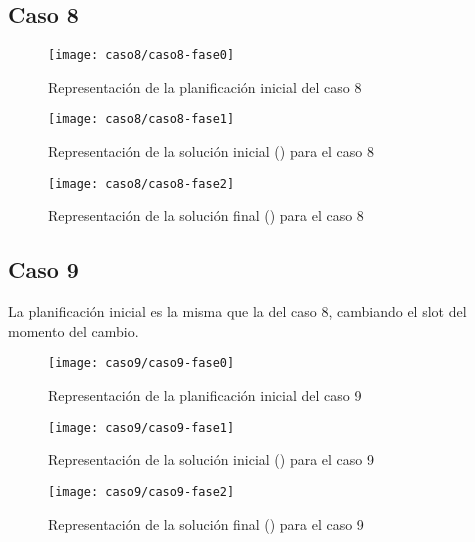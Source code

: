 \FloatBarrier
\newpage
\subsection{Caso 8}

\begin{figure}[!h]
	\centering
	\texttt{[image: caso8/caso8-fase0]}
	\caption{Representación de la planificación inicial del caso 8}
	\label{fig:caso8-fase0}
\end{figure}

\begin{figure}[!h]
	\centering
	\texttt{[image: caso8/caso8-fase1]}
	\caption{Representación de la solución inicial (\faseuno{}) para el caso 8}
	\label{fig:caso8-fase1}
\end{figure}

\begin{figure}[!h]
	\centering
	\texttt{[image: caso8/caso8-fase2]}
	\caption{Representación de la solución final (\fasedos{}) para el caso 8}
	\label{fig:caso8-fase2}
\end{figure}

\FloatBarrier
\newpage
\subsection{Caso 9}

La planificación inicial es la misma que la del caso 8, cambiando el slot del momento del cambio.

\begin{figure}[!h]
	\centering
	\texttt{[image: caso9/caso9-fase0]}
	\caption{Representación de la planificación inicial del caso 9}
	\label{fig:caso9-fase0}
\end{figure}

\begin{figure}[!h]
	\centering
	\texttt{[image: caso9/caso9-fase1]}
	\caption{Representación de la solución inicial (\faseuno{}) para el caso 9}
	\label{fig:caso9-fase1}
\end{figure}

\begin{figure}[!h]
	\centering
	\texttt{[image: caso9/caso9-fase2]}
	\caption{Representación de la solución final (\fasedos{}) para el caso 9}
	\label{fig:caso9-fase2}
\end{figure}
